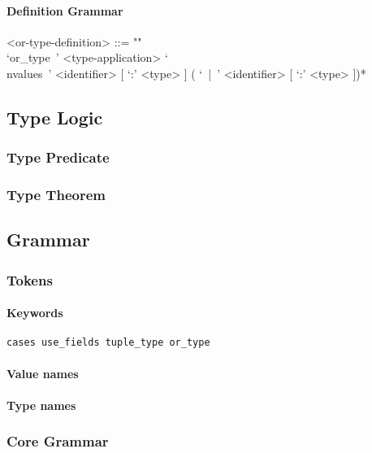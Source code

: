 \documentclass{article}
\begin{document}
\paragraph{Definition Grammar}
\begin{grammar}
<or-type-definition> ::= ""\\
`or_type\ ' <type-application> 
`\\nvalues\ ' <identifier> [ `:' <type> ] ( `\ |\ ' <identifier> [ `:' <type> ])*
\end{grammar}

\subsection{Type Logic}

\subsubsection{Type Predicate}

\subsubsection{Type Theorem}

\subsection{Grammar}
\subsubsection{Tokens}

\paragraph{Keywords}

\begin{verbatim}
cases use_fields tuple_type or_type
\end{verbatim}

\paragraph{Value names}

\paragraph{Type names}

\subsubsection{Core Grammar}
\end{document}
